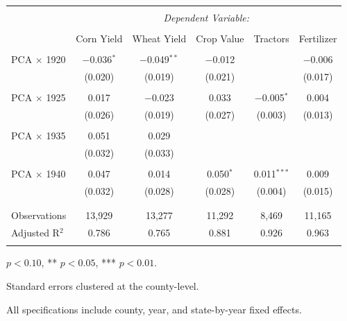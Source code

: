 \documentclass[12pt]{article}
\begin{document}
\begin{appendices}
\begin{table}[!htbp]
\begin{threeparttable}[t]
  \begin{tabular}{@{\extracolsep{5pt}}lccccc} 
  \\[-1.8ex]\hline 
  \hline \\[-1.8ex] 
   & \multicolumn{5}{c}{\textit{Dependent Variable:}} \\ 
  \cline{2-6} 
  \\[-1.8ex] & Corn Yield & Wheat Yield & Crop Value & Tractors & Fertilizer \\ 
  \hline \\[-1.8ex] 
PCA $\times$ 1920 & $-$0.036$^{*}$ & $-$0.049$^{**}$ & $-$0.012 &  & $-$0.006 \\ 
& (0.020) & (0.019) & (0.021) &  & (0.017) \\ 
& & & & & \\ 
PCA $\times$ 1925 & 0.017 & $-$0.023 & 0.033 & $-$0.005$^{*}$ & 0.004 \\ 
& (0.026) & (0.019) & (0.027) & (0.003) & (0.013) \\ 
& & & & & \\ 
PCA $\times$ 1935 & 0.051 & 0.029 &  &  &  \\ 
& (0.032) & (0.033) &  &  &  \\ 
& & & & & \\ 
PCA $\times$ 1940 & 0.047 & 0.014 & 0.050$^{*}$ & 0.011$^{***}$ & 0.009 \\ 
& (0.032) & (0.028) & (0.028) & (0.004) & (0.015) \\ 
& & & & & \\ 
\hline \\[-1.8ex] 
Observations & 13,929 & 13,277 & 11,292 & 8,469 & 11,165 \\ 
Adjusted R$^{2}$ & 0.786 & 0.765 & 0.881 & 0.926 & 0.963 \\ 
\hline 
\hline \\[-1.8ex] 
\end{tabular} 
\begin{tablenotes}
    \item {\footnotesize * \(p<0.10\), ** \(p<0.05\), *** \(p<0.01\).}
    \item {\footnotesize Standard errors clustered at the county-level.}
    \item {\footnotesize All specifications include county, year, and state-by-year fixed effects.}
    \end{tablenotes}
    \end{threeparttable} 

\end{table}











\end{appendices}
\end{document}
